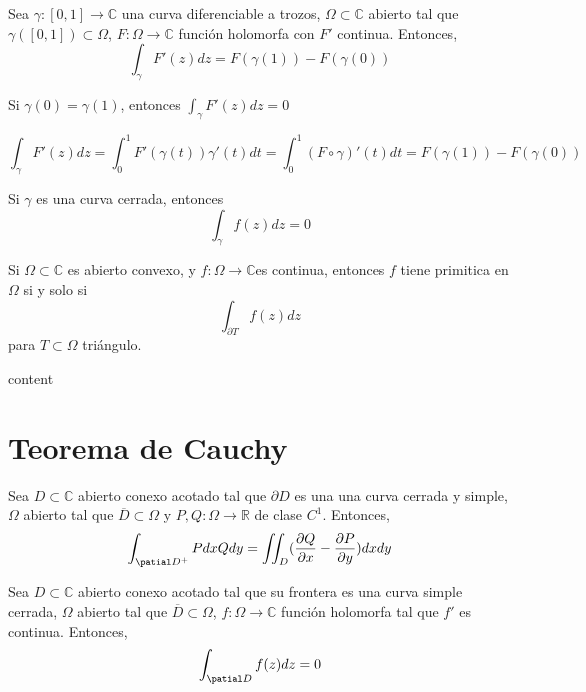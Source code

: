 \begin{theo}
  Sea $\gamma: [0,1] \to \mathbb{C}$ una curva diferenciable a trozos, $\Omega \subset \mathbb{C}$ abierto tal que $\gamma([0,1]) \subset \Omega$, $F: \Omega \to \mathbb{C}$ función holomorfa con $F'$ continua. Entonces,
  \[ 
    \int_{\gamma}^{} F'(z) dz = F(\gamma(1)) - F(\gamma(0)) 
  \] 
\end{theo}

\begin{obs}
  Si $\gamma(0) = \gamma(1)$, entonces $\int_{\gamma}^{} F'(z) dz = 0$
\end{obs}

\begin{dem}
  \[ 
    \int_{\gamma}^{} F'(z) dz = \int_{0}^{1} F'(\gamma(t))\gamma'(t) dt = \int_{0}^{1} (F \circ \gamma)'(t) dt = F(\gamma(1)) - F(\gamma(0))
  \] 
\end{dem}

\begin{cor}
  Si $\gamma$ es una curva cerrada, entonces
  \[ 
    \int_{\gamma}^{} f(z) dz= 0 
  \] 
\end{cor}

\begin{theo}
  Si $\Omega \subset \mathbb{C}$ es abierto convexo, y $f: \Omega \to \mathbb{C}$es continua, entonces $f$ tiene primitica en $ \Omega$ si y solo si 
  \[ 
    \int_{\partial T}^{} f(z) dz 
  \] 
  para $T \subset \Omega$ triángulo.
\end{theo}

\begin{dem}
  content
\end{dem}

\section{Teorema de Cauchy}

\begin{defn}
  Sea $D \subset \mathbb{C}$ abierto conexo acotado tal que $\partial D$ es una una curva cerrada y simple, $\Omega$ abierto tal que $\overline{D} \subset \Omega$ y $P,Q: \Omega \to \mathbb{R}$ de clase $C^1$. Entonces,
  \[ 
    \int_{\patial D^+}^{} Pdx Qdy = \iint_{D}^{} (\frac{\partial{Q}}{\partial{x}} - \frac{\partial{P}}{\partial{y}})dxdy
  \] 
\end{defn}

\begin{theo}[Cauchy]
  Sea $D \subset \mathbb{C}$ abierto conexo acotado tal que su frontera es una curva simple cerrada, $\Omega$ abierto tal que $\overline{D} \subset \Omega$, $f: \Omega \to \mathbb{C}$ función holomorfa tal que $f'$ es continua. Entonces,
  \[ 
    \int_{\patial D }^{} f(z) dz = 0
  \] 
\end{theo}


